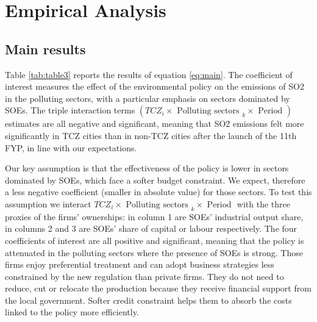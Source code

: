 \documentclass[12pt]{article}
\begin{document}
\section{Empirical Analysis} \label{sec:analysis}

\subsection{Main results} \label{sec:main}

Table \ref{tab:table3} reports the results of equation \ref{eq:main}. The coefficient of interest measures the effect of the environmental policy on the emissions of SO2 in the polluting sectors, with a particular emphasis on sectors dominated by SOEs. The triple interaction terms $(T C Z_{i} \times \text {  Polluting sectors }_{k} \times \text { Period })$ estimates are all negative and significant, meaning that SO2 emissions felt more significantly in TCZ cities than in non-TCZ cities after the launch of the 11th FYP, in line with our expectations.

Our key assumption is that the effectiveness of the policy is lower in sectors dominated by SOEs, which face a softer budget constraint. We expect, therefore a less negative coefficient (smaller in absolute value) for those sectors. To test this assumption we interact $T C Z_{i} \times \text {  Polluting sectors }_{k} \times \text { Period }$ with the three proxies of the firms' ownerships: in column 1 are SOEs' industrial output share, in columns 2 and 3 are SOEs' share of capital or labour respectively. The four coefficients of interest are all positive and significant, meaning that the policy is attenuated in the polluting sectors where the presence of SOEs is strong. Those firms enjoy preferential treatment and can adopt business strategies less constrained by the new regulation than private firms. They do not need to reduce, cut or relocate the production because they receive financial support from the local government. Softer credit constraint helps them to absorb the costs linked to the policy more efficiently.
\end{document}
